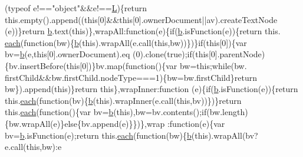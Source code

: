 \begin{DoxyCode}
      (typeof e!==\textcolor{stringliteral}{"object"}&&e!==\hyperlink{a00039_a38ee4c0b5f4fe2a18d0c783af540d253}{L})\{\textcolor{keywordflow}{return} this.empty().append((\textcolor{keyword}{this}[0]&&\textcolor{keyword}{this}[0].ownerDocument||av).createTextNode
      (e))\}\textcolor{keywordflow}{return} \hyperlink{a00039_aa4026ad5544b958e54ce5e106fa1c805}{b}.text(\textcolor{keyword}{this})\},wrapAll:\textcolor{keyword}{function}(e)\{\textcolor{keywordflow}{if}(\hyperlink{a00039_aa4026ad5544b958e54ce5e106fa1c805}{b}.isFunction(e))\{\textcolor{keywordflow}{return} this.
      \hyperlink{a00039_a871ff39db627c54c710a3e9909b8234c}{each}(\textcolor{keyword}{function}(bw)\{\hyperlink{a00039_aa4026ad5544b958e54ce5e106fa1c805}{b}(\textcolor{keyword}{this}).wrapAll(e.call(\textcolor{keyword}{this},bw))\})\}\textcolor{keywordflow}{if}(\textcolor{keyword}{this}[0])\{var bv=\hyperlink{a00039_aa4026ad5544b958e54ce5e106fa1c805}{b}(e,\textcolor{keyword}{this}[0].ownerDocument).eq
      (0).clone(\textcolor{keyword}{true});\textcolor{keywordflow}{if}(\textcolor{keyword}{this}[0].parentNode)\{bv.insertBefore(\textcolor{keyword}{this}[0])\}bv.map(\textcolor{keyword}{function}()\{var bw=\textcolor{keyword}{this};\textcolor{keywordflow}{while}(bw.
      firstChild&&bw.firstChild.nodeType===1)\{bw=bw.firstChild\}\textcolor{keywordflow}{return} bw\}).append(\textcolor{keyword}{this})\}\textcolor{keywordflow}{return} \textcolor{keyword}{this}\},wrapInner:\textcolor{keyword}{function}
      (e)\{\textcolor{keywordflow}{if}(\hyperlink{a00039_aa4026ad5544b958e54ce5e106fa1c805}{b}.isFunction(e))\{\textcolor{keywordflow}{return} this.\hyperlink{a00039_a871ff39db627c54c710a3e9909b8234c}{each}(\textcolor{keyword}{function}(bv)\{\hyperlink{a00039_aa4026ad5544b958e54ce5e106fa1c805}{b}(\textcolor{keyword}{this}).wrapInner(e.call(\textcolor{keyword}{this},bv))\})\}\textcolor{keywordflow}{return} 
      this.\hyperlink{a00039_a871ff39db627c54c710a3e9909b8234c}{each}(\textcolor{keyword}{function}()\{var bv=\hyperlink{a00039_aa4026ad5544b958e54ce5e106fa1c805}{b}(\textcolor{keyword}{this}),bw=bv.contents();\textcolor{keywordflow}{if}(bw.length)\{bw.wrapAll(e)\}\textcolor{keywordflow}{else}\{bv.append(e)\}\})\},wrap
      :\textcolor{keyword}{function}(e)\{var bv=\hyperlink{a00039_aa4026ad5544b958e54ce5e106fa1c805}{b}.isFunction(e);\textcolor{keywordflow}{return} this.\hyperlink{a00039_a871ff39db627c54c710a3e9909b8234c}{each}(\textcolor{keyword}{function}(bw)\{\hyperlink{a00039_aa4026ad5544b958e54ce5e106fa1c805}{b}(\textcolor{keyword}{this}).wrapAll(bv?e.call(\textcolor{keyword}{this},bw):e

\end{DoxyCode}
